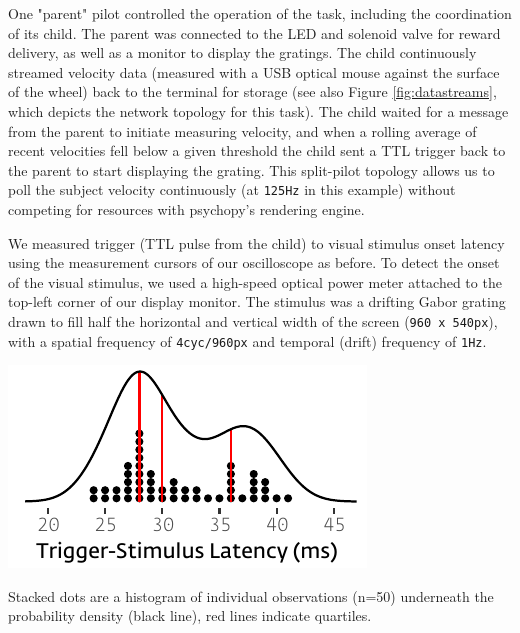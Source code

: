One "parent" pilot controlled the operation of the task, including the coordination of its child. The parent was connected to the LED and solenoid valve for reward delivery, as well as a monitor to display the gratings. The child continuously streamed velocity data (measured with a USB optical mouse against the surface of the wheel) back to the terminal for storage (see also Figure \ref{fig:datastreams}, which depicts the network topology for this task). The child waited for a message from the parent to initiate measuring velocity, and when a rolling average of recent velocities fell below a given threshold the child sent a TTL trigger back to the parent to start displaying the grating. This split-pilot topology allows us to poll the subject velocity continuously (at \texttt{125Hz} in this example) without competing for resources with psychopy's rendering engine.

We measured trigger (TTL pulse from the child) to visual stimulus onset latency using the measurement cursors of our oscilloscope as before. To detect the onset of the visual stimulus, we used a high-speed optical power meter attached to the top-left corner of our display monitor. The stimulus was a drifting Gabor grating drawn to fill half the horizontal and vertical width of the screen (\texttt{960 x 540px}), with a spatial frequency of \texttt{4cyc/960px} and temporal (drift) frequency of \texttt{1Hz}.

\begin{marginfigure}[-0cm]
\includegraphics[]{figures/test_6_visual_lags.pdf}
\caption{Stacked dots are a histogram of individual observations (n=50) underneath the probability density (black line), red lines indicate quartiles.}
\label{fig:vidlat}
\end{marginfigure}

